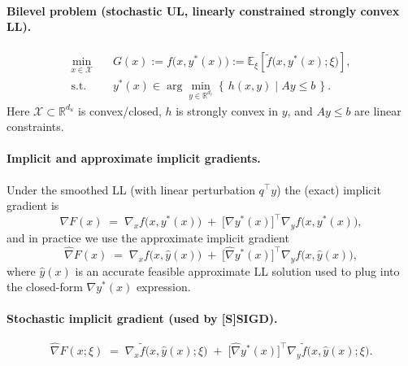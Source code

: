 \usepackage{amsmath,amssymb,amsfonts}
\usepackage{algorithm,algpseudocode}
\newtheorem{assumption}{Assumption}
\newtheorem{theorem}{Theorem}
\newtheorem{definition}{Definition}

\paragraph{Bilevel problem (stochastic UL, linearly constrained strongly convex LL).}
\begin{align}
\min_{x\in \mathcal{X}} \quad 
& G(x) := f\big(x, y^*(x)\big) := \mathbb{E}_{\xi}\!\left[\tilde f\big(x, y^*(x); \xi\big)\right], \label{eq:ul}\\
\text{s.t.}\quad 
& y^*(x) \in \arg\min_{y\in \mathbb{R}^{d_\ell}}\left\{\, h(x,y)\; \big| \; Ay \le b \,\right\}. \label{eq:ll}
\end{align}
Here $\mathcal{X}\subset\mathbb{R}^{d_u}$ is convex/closed, $h$ is strongly convex in $y$, and $Ay\le b$ are linear constraints.

\paragraph{Implicit and approximate implicit gradients.}
Under the smoothed LL (with linear perturbation $q^\top y$) the (exact) implicit gradient is
\begin{equation}
\nabla F(x) \;=\; \nabla_x f\big(x,y^*(x)\big)\;+\;\big[\nabla y^*(x)\big]^\top \nabla_y f\big(x,y^*(x)\big),
\label{eq:implicit-grad}
\end{equation}
and in practice we use the approximate implicit gradient
\begin{equation}
\widehat{\nabla}F(x) \;=\; \nabla_x f\big(x,\hat y(x)\big)\;+\;\big[\widehat{\nabla} y^*(x)\big]^\top \nabla_y f\big(x,\hat y(x)\big),
\label{eq:approx-implicit-grad}
\end{equation}
where $\hat y(x)$ is an accurate feasible approximate LL solution used to plug into the closed-form $\nabla y^*(x)$ expression.

\paragraph{Stochastic implicit gradient (used by [S]SIGD).}
\begin{equation}
\widehat{\nabla}F(x;\xi)
\;=\;
\nabla_x \tilde f\big(x,\hat y(x);\xi\big)\;+\;\big[\widehat{\nabla}y^*(x)\big]^\top \nabla_y \tilde f\big(x,\hat y(x);\xi\big).
\label{eq:stoch-implicit-grad}
\end{equation}


